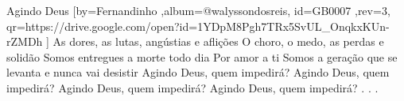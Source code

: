 \beginsong
{Agindo Deus %
}[by={Fernandinho %
},album={@walyssondosreis},
id={GB0007 %
},rev={3}, %
qr={https://drive.google.com/open?id=1YDpM8Pgh7TRx5SvUL_OnqkxKUn-rZMDh %
}]
\beginverse
As dores, as lutas, angústias e aflições
O choro, o medo, as perdas e solidão
\endverse
{}
\beginverse
Somos entregues a morte todo dia
Por amor a ti
Somos a geração que se levanta e nunca vai desistir
\endverse
\beginchorus
Agindo Deus, quem impedirá?
Agindo Deus, quem impedirá?
Agindo Deus, quem impedirá?
Agindo Deus, quem impedirá?
\endchorus
{}
\beginverse*\color{white}
.
.
.
\endverse


